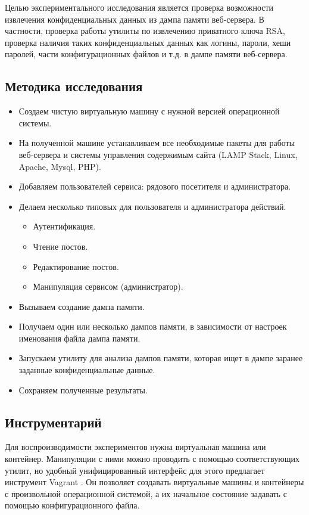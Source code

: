 \documentclass[20pt]{article}
\begin{document}
Целью экспериментального исследования является проверка возможности извлечения
конфиденциальных данных из дампа памяти веб-сервера. В частности, проверка работы
утилиты по извлечению приватного ключа RSA, проверка наличия таких конфиденциальных
данных как логины, пароли, хеши паролей, части конфигурационных файлов и т.д. в
дампе памяти веб-сервера.

\subsection{Методика исследования}

\begin{itemize}
  \item Создаем чистую виртуальную машину с нужной версией операционной системы.
  \item На полученной машине устанавливаем все необходимые пакеты для работы
  веб-сервера и системы управления содержимым сайта (LAMP Stack, Linux, Apache,
  Mysql, PHP).
  \item Добавляем пользователей сервиса: рядового посетителя и администратора.
  \item Делаем несколько типовых для пользователя и администратора действий.
  \begin{itemize}
    \item Аутентификация.
    \item Чтение постов.
    \item Редактирование постов.
    \item Манипуляция сервисом (администратор).
  \end{itemize}
  \item Вызываем создание дампа памяти.
  \item Получаем один или несколько дампов памяти, в зависимости от настроек
  именования файла дампа памяти.
  \item Запускаем утилиту для анализа дампов памяти, которая ищет в дампе
  заранее заданные конфиденциальные данные.
  \item Сохраняем полученные результаты.
\end{itemize}

\subsection{Инструментарий}

Для воспроизводимости экспериментов нужна виртуальная машина или контейнер.
Манипуляции с ними можно проводить с помощью соответствующих утилит, но
удобный унифицированный интерфейс для этого предлагает инструмент Vagrant \cite{vagrant}.
Он позволяет создавать виртуальные машины и контейнеры с произвольной
операционной системой, а их начальное состояние задавать с помощью конфигурационного
файла.
\end{document}
